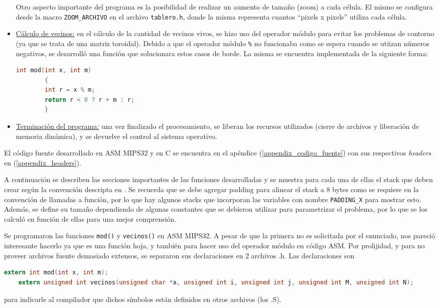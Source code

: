 \documentclass[a4paper,12pt]{article}
\newcommand{\quotes}[1]{``#1''}
\numberwithin{equation}{section}
\numberwithin{figure}{section}
\begin{document}
\begin{itemize}
		Otro aspecto importante del programa es la posibilidad de realizar un aumento de tamaño (zoom) a cada célula. El mismo se configura desde la macro \texttt{ZOOM\_ARCHIVO} en el archivo  \texttt{tablero.h}, donde la misma representa cuantos \quotes{pixels x pixels} utiliza cada célula.
		
		\item \underline{Cálculo de vecinos:} en el cálculo de la cantidad de vecinos vivos, se hizo uso del operador módulo para evitar los problemas de contorno (ya que se trata de una matriz toroidal). Debido a que el operador módulo \texttt{\%} no funcionaba como se espera cuando se utiizan números negativos, se desarrolló una función que solucionara estos casos de borde. La misma se encuentra implementada de la siguiente forma:
		\begin{lstlisting}[language=C, style=StyleC]
		int mod(int x, int m)
		{
		int r = x % m;
		return r < 0 ? r + m : r;
		}
		\end{lstlisting}
		
		\item \underline{Terminación del programa:} una vez finalizado el procesamiento, se liberan los recursos utilizados (cierre de archivos y liberación de memoria dinámica), y se devuelve el control al sistema operativo.
		
	\end{itemize}
	
	El código fuente desarrollado en ASM MIPS32 y en C se encuentra en el apéndice (\ref{appendix_codigo_fuente}) con sus respectivos \emph{headers} en (\ref{appendix_headers}).
	
	A continuación se describen las secciones importantes de las funciones desarrolladas y se muestra para cada una de ellas el stack que deben crear según la convención descripta en \cite{abi}. Se recuerda que se debe agregar padding para alinear el stack a 8 bytes como se requiere en la convención de llamadas a función, por lo que hay algunos stacks que incorporan las variables con nombre \texttt{PADDING\_X} para mostrar esto. Además, se define su tamaño dependiendo de algunas constantes que se debieron utilizar para parametrizar el problema, por lo que se los calculó en función de ellas para una mejor comprensión.
	
	Se programaron las funciones \texttt{mod()} y \texttt{vecinos()} en ASM MIPS32. A pesar de que la primera no es solicitada por el enunciado, nos pareció interesante hacerlo ya que es una función hoja, y también para hacer uso del operador módulo en código ASM. Por prolijidad, y para no proveer archivos fuente demasiado extensos, se separaron sus declaraciones en 2 archivos .h. Las declaraciones son
	\begin{lstlisting}[language=C, style=StyleC]
	extern int mod(int x, int m);
	extern unsigned int vecinos(unsigned char *a, unsigned int i, unsigned int j, unsigned int M, unsigned int N);
	\end{lstlisting}
	para indicarle al compilador que dichos símbolos están definidos en otros archivos (los .S). 
	
\end{document}
